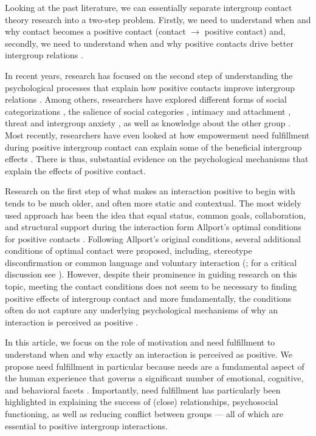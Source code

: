 \documentclass[man, 12pt, a4paper, mask]{apa7}
\theoremstyle{break}
\theoremstyle{plain}
\begin{document}
Looking at the past literature, we can essentially separate intergroup contact theory research into a two-step problem. Firstly, we need to understand when and why contact becomes a positive contact (contact $\rightarrow$ positive contact) and, secondly, we need to understand when and why positive contacts drive better intergroup relations \citep[positive contact $\rightarrow$ better relations; e.g., see ][]{Allport1954b, Hewstone1996, Pettigrew1998}.

In recent years, research has focused on the second step of understanding the psychological processes that explain how positive contacts improve intergroup relations \citep[e.g. see,][]{Paolini2021}. Among others, researchers have explored different forms of social categorizations \citep[][]{Pettigrew1998}, the salience of social categories \citep[][]{Brown2005}, intimacy \citep[e.g.,][]{Marinucci2021} and attachment \citep[e.g.,][]{Tropp2021}, threat and intergroup anxiety \citep[e.g.,][]{Stephan2008}, as well as knowledge about the other group \citep[][]{Pettigrew2008c}. Most recently, researchers have even looked at how empowerment need fulfillment during positive intergroup contact can explain some of the beneficial intergroup effects \citep[][]{Hassler2021}. There is thus, substantial evidence on the psychological mechanisms that explain the effects of positive contact.

Research on the first step of what makes an interaction positive to begin with tends to be much older, and often more static and contextual. The most widely used approach has been the idea that equal status, common goals, collaboration, and structural support during the interaction form Allport's optimal conditions for positive contacts \citep[][]{Allport1954b, Pettigrew1969}. Following Allport's original conditions, several additional conditions of optimal contact were proposed, including, stereotype disconfirmation \citep[][]{cook1978} or common language and voluntary interaction (\citealp{wagner1986}; for a critical discussion see \citealp{Pettigrew1986}). However, despite their prominence in guiding research on this topic, meeting the contact conditions does not seem to be necessary to finding positive effects of intergroup contact \citep[][]{Pettigrew2006} and more fundamentally, the conditions often do not capture any underlying psychological mechanisms of why an interaction is perceived as positive \citep[e.g.,][]{Pettigrew1998}.

In this article, we focus on the role of motivation and need fulfillment to understand when and why exactly an interaction is perceived as positive. We propose need fulfillment in particular because needs are a fundamental aspect of the human experience that governs a significant number of emotional, cognitive, and behavioral facets \citep[][]{kreienkamp2022d, kruglanski2002}. Importantly, need fulfillment has particularly been highlighted in explaining the success of (close) relationships, psychosocial functioning, as well as reducing conflict between groups --- all of which are essential to positive intergroup interactions.
\end{document}
